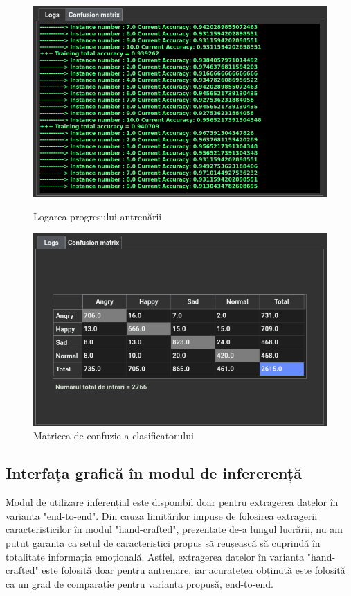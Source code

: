 \documentclass[a4paper,12pt]{book}
\begin{document}
		\begin{figure}[h]
			\hspace{-1.25cm}
			\begin{minipage}{0.60\textwidth}
				\centering
				\includegraphics[scale=0.40]{gui_train_logs}
				\caption{Logarea progresului antrenării}\label{Fig:gui_train_logs}
			\end{minipage}\hfill
		\hspace{-0.3cm}
			\begin{minipage}{0.60\textwidth}
				\centering
				\includegraphics[scale=0.399]{gui_train_tabel}
				\caption{Matricea de confuzie a clasificatorului}\label{Fig:gui_train_table}
			\end{minipage}
		\end{figure} 
		\subsection{Interfața grafică în modul de infererență}
		Modul de utilizare inferențial este disponibil doar pentru extragerea datelor în varianta "end-to-end". Din cauza limitărilor impuse de folosirea extragerii caracteristicilor în modul "hand-crafted", prezentate de-a lungul lucrării, nu am putut garanta ca setul de caracteristici propus să reușească să cuprindă în totalitate informația emoțională. Astfel, extragerea datelor în varianta "hand-crafted" este folosită doar pentru antrenare, iar acuratețea obținută este folosită ca un grad de comparație pentru varianta propusă, end-to-end. \par
		
\end{document}
